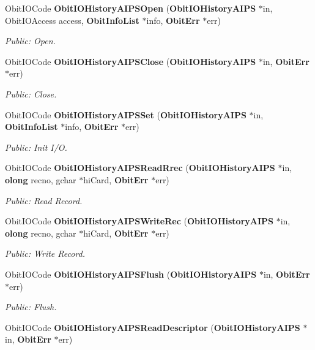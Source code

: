 \begin{CompactItemize}
Obit\-IOCode {\bf Obit\-IOHistory\-AIPSOpen} ({\bf Obit\-IOHistory\-AIPS} $\ast$in, Obit\-IOAccess access, {\bf Obit\-Info\-List} $\ast$info, {\bf Obit\-Err} $\ast$err)
\begin{CompactList}\small\item\em Public: Open. \item\end{CompactList}\item 
Obit\-IOCode {\bf Obit\-IOHistory\-AIPSClose} ({\bf Obit\-IOHistory\-AIPS} $\ast$in, {\bf Obit\-Err} $\ast$err)
\begin{CompactList}\small\item\em Public: Close. \item\end{CompactList}\item 
Obit\-IOCode {\bf Obit\-IOHistory\-AIPSSet} ({\bf Obit\-IOHistory\-AIPS} $\ast$in, {\bf Obit\-Info\-List} $\ast$info, {\bf Obit\-Err} $\ast$err)
\begin{CompactList}\small\item\em Public: Init I/O. \item\end{CompactList}\item 
Obit\-IOCode {\bf Obit\-IOHistory\-AIPSRead\-Rrec} ({\bf Obit\-IOHistory\-AIPS} $\ast$in, {\bf olong} recno, gchar $\ast$hi\-Card, {\bf Obit\-Err} $\ast$err)
\begin{CompactList}\small\item\em Public: Read Record. \item\end{CompactList}\item 
Obit\-IOCode {\bf Obit\-IOHistory\-AIPSWrite\-Rec} ({\bf Obit\-IOHistory\-AIPS} $\ast$in, {\bf olong} recno, gchar $\ast$hi\-Card, {\bf Obit\-Err} $\ast$err)
\begin{CompactList}\small\item\em Public: Write Record. \item\end{CompactList}\item 
Obit\-IOCode {\bf Obit\-IOHistory\-AIPSFlush} ({\bf Obit\-IOHistory\-AIPS} $\ast$in, {\bf Obit\-Err} $\ast$err)
\begin{CompactList}\small\item\em Public: Flush. \item\end{CompactList}\item 
Obit\-IOCode {\bf Obit\-IOHistory\-AIPSRead\-Descriptor} ({\bf Obit\-IOHistory\-AIPS} $\ast$in, {\bf Obit\-Err} $\ast$err)

\end{CompactItemize}
